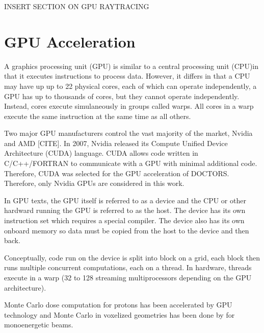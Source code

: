 INSERT SECTION ON GPU RAYTRACING

\section{GPU Acceleration}

A graphics processing unit (GPU) is similar to a central processing unit (CPU)in that it executes instructions to process data. However, it differs in that a CPU may have up up to 22 physical cores, each of which can operate independently, a GPU has up to thousands of cores, but they cannot operate independently. Instead, cores execute simulaneously in groups called warps. All cores in a warp execute the same instruction at the same time as all others. 

Two major GPU manufacturers control the vast majority of the market, Nvidia and AMD [CITE]. In 2007, Nvidia released its Compute Unified Device Architecture (CUDA) language. CUDA allows code written in C/C++/FORTRAN to communicate with a GPU with minimal additional code. Therefore, CUDA was selected for the GPU acceleration of DOCTORS. Therefore, only Nvidia GPUs are considered in this work.

In GPU texts, the GPU itself is referred to as a device and the CPU or other hardward running the GPU is referred to as the host. The device has its own instruction set which requires a special compiler. The device also has its own onboard memory so data must be copied from the host to the device and then back.

Conceptually, code run on the device is split into block on a grid, each block then runs multiple concurrent computations, each on a thread. In hardware, threads execute in a warp (32 to 128 streaming multiprocessors depending on the GPU architecture).

Monte Carlo dose computation for protons has been accelerated by GPU technology \citep{ref:jiax} and Monte Carlo in voxelized geometries has been done by \citep{ref:hissoinys} for monoenergetic beams.

\endinput
